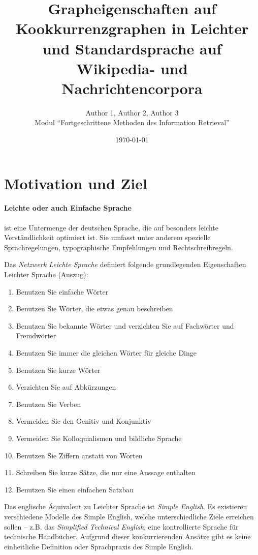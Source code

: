\documentclass[11pt, a4paper]{article}
\title{Grapheigenschaften auf Kookkurrenzgraphen in Leichter und
    Standardsprache auf Wikipedia- und Nachrichtencorpora}
\author{Author 1, Author 2, Author 3\\
    Modul "`Fortgeschrittene Methoden des Information Retrieval"'}
\date{\today}
\begin{document}
\maketitle
\tableofcontents
\newpage

\section{Motivation und Ziel}

\paragraph{Leichte oder auch Einfache Sprache} ist eine Untermenge der deutschen Sprache,
die auf besonders leichte Verst\"andlichkeit optimiert ist. Sie umfasst unter
anderem spezielle Sprachregelungen, typographische Empfehlungen und
Rechtschreibregeln. 

Das \emph{Netzwerk Leichte Sprache} definiert folgende grundlegenden
Eigenschaften Leichter Sprache\cite{nls_regeln} (Auszug):

\begin{enumerate}
	\item Benutzen Sie einfache W\"orter
	\item Benutzen Sie W\"orter, die etwas genau beschreiben
	\item Benutzen Sie bekannte W\"orter und verzichten Sie auf Fachw\"orter und Fremdw\"orter
	\item Benutzen Sie immer die gleichen W\"orter f\"ur gleiche Dinge
	\item Benutzen Sie kurze W\"orter
	\item Verzichten Sie auf Abk\"urzungen
	\item Benutzen Sie Verben
	\item Vermeiden Sie den Genitiv und Konjunktiv
	\item Vermeiden Sie Kolloquialismen und bildliche Sprache
	\item Benutzen Sie Ziffern anstatt von Worten
	\item Schreiben Sie kurze S\"atze, die nur eine Aussage enthalten
	\item Benutzen Sie einen einfachen Satzbau
\end{enumerate}

Das englische \"Aquivalent zu Leichter Sprache ist \emph{Simple English}. Es
existieren verschiedene Modelle des Simple English, welche unterschiedliche
Ziele erreichen sollen -- z.B. das \emph{Simplified Technical English}, eine
kontrollierte Sprache f\"ur technische Handb\"ucher. Aufgrund dieser
konkurrierenden Ans\"atze gibt es keine einheitliche Definition oder
Sprachpraxis des Simple English.
\end{document}
